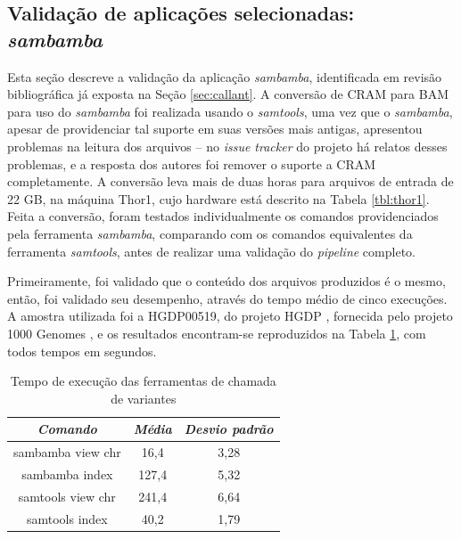 \documentclass[cic,tc]{iiufrgs}
\begin{document}
\subsection{Validação de aplicações selecionadas: \textit{sambamba}}
\label{sec:sambamba}

Esta seção descreve a validação da aplicação \textit{sambamba}, identificada em revisão
bibliográfica já exposta na Seção \ref{sec:callant}. A conversão de CRAM para
BAM para uso do \textit{sambamba} foi realizada usando o \textit{samtools}, uma vez que o
\textit{sambamba}, apesar de providenciar tal suporte em suas versões mais antigas,
apresentou problemas na leitura dos arquivos -- no \textit{issue tracker} do
projeto há relatos desses problemas, e a resposta dos autores foi remover o
suporte a CRAM completamente. A conversão leva mais de duas horas para arquivos
de entrada de 22 GB, na máquina Thor1, cujo hardware está descrito na
Tabela \ref{tbl:thor1}. Feita a conversão, foram testados individualmente os
comandos providenciados pela ferramenta \textit{sambamba}, comparando com os comandos
equivalentes da ferramenta \textit{samtools}, antes de realizar uma validação
do \textit{pipeline} completo. 

Primeiramente, foi validado que o conteúdo dos arquivos produzidos é o mesmo,
então, foi validado seu desempenho, através do tempo médio de cinco execuções.
A amostra utilizada foi a HGDP00519, do projeto HGDP \cite{cavalli2005human},
fornecida pelo projeto 1000 Genomes \cite{via20101000}, e os resultados
encontram-se reproduzidos na Tabela \ref{tbl:sambamba}, com todos tempos em segundos.

\begin{table}[h]
    \caption{Tempo de execução das ferramentas de chamada de variantes}
    \centering
        \begin{tabular}{c|c|c}
          \hline
          \textit{Comando}  &   \textit{Média}  & \textit{Desvio padrão} \\
          \hline
          \hline
          sambamba view chr & 16,4  & 3,28 \\
          sambamba index    & 127,4 & 5,32 \\
          samtools view chr & 241,4 & 6,64 \\
          samtools index    & 40,2  & 1,79 \\
          \hline
        \end{tabular}
    \label{tbl:sambamba}
\end{table}
\end{document}
